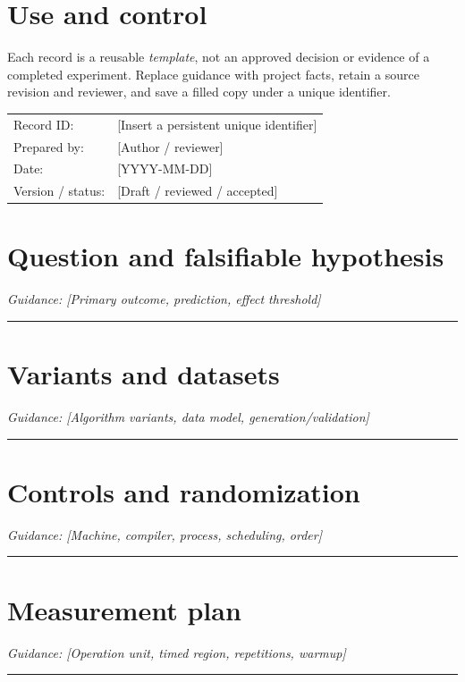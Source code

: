 \documentclass[11pt]{article}
\begin{document}
\makedoctitle
\section{Use and control}
Each record is a reusable \emph{template}, not an approved decision or evidence of a completed experiment. Replace guidance with project facts, retain a source revision and reviewer, and save a filled copy under a unique identifier.\par\medskip
\begin{tabularx}{\linewidth}{@{}lX@{}}Record ID: & [Insert a persistent unique identifier] \\ Prepared by: & [Author / reviewer] \\ Date: & [YYYY-MM-DD] \\ Version / status: & [Draft / reviewed / accepted] \\\end{tabularx}
\section{Question and falsifiable hypothesis}
\noindent\textit{Guidance: [Primary outcome, prediction, effect threshold]}\par\vspace{0.9cm}\hrule\vspace{0.25cm}
\section{Variants and datasets}
\noindent\textit{Guidance: [Algorithm variants, data model, generation/validation]}\par\vspace{0.9cm}\hrule\vspace{0.25cm}
\section{Controls and randomization}
\noindent\textit{Guidance: [Machine, compiler, process, scheduling, order]}\par\vspace{0.9cm}\hrule\vspace{0.25cm}
\section{Measurement plan}
\noindent\textit{Guidance: [Operation unit, timed region, repetitions, warmup]}\par\vspace{0.9cm}\hrule\vspace{0.25cm}
\end{document}
